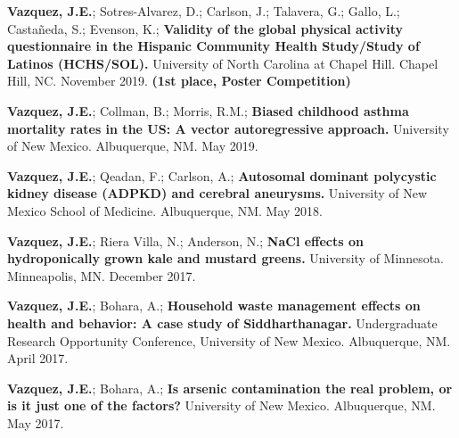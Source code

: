 \begin{cventries}
{\begin{etaremune}
    \item {\bf Vazquez, J.E.}; Sotres-Alvarez, D.; Carlson, J.; Talavera, G.; Gallo, L.; 
          Castañeda, S.; Evenson, K.; \textbf{Validity of the global physical activity questionnaire 
          in the Hispanic Community Health Study/Study of Latinos (HCHS/SOL).} University of North 
          Carolina at Chapel Hill. Chapel Hill, NC. November 2019. \textbf{(1st place, Poster Competition)}

    \item {\bf Vazquez, J.E.}; Collman, B.; Morris, R.M.; \textbf{Biased childhood asthma 
          mortality rates in the US: A vector autoregressive approach.} University of New Mexico. 
          Albuquerque, NM. May 2019.

    \item {\bf Vazquez, J.E.}; Qeadan, F.; Carlson, A.; \textbf{Autosomal dominant polycystic 
          kidney disease (ADPKD) and cerebral aneurysms.} University of New Mexico School of 
          Medicine. Albuquerque, NM. May 2018.

    \item {\bf Vazquez, J.E.}; Riera Villa, N.; Anderson, N.; \textbf{NaCl effects on 
          hydroponically grown kale and mustard greens.} University of Minnesota. 
          Minneapolis, MN. December 2017.

    \item {\bf Vazquez, J.E.}; Bohara, A.; \textbf{Household waste management effects on health 
          and behavior: A case study of Siddharthanagar.} Undergraduate Research Opportunity 
          Conference, University of New Mexico. Albuquerque, NM. April 2017.

    \item {\bf Vazquez, J.E.}; Bohara, A.; \textbf{Is arsenic contamination the real problem, 
          or is it just one of the factors?} University of New Mexico. Albuquerque, NM. May 2017.

\end{etaremune}
}

\end{cventries}
